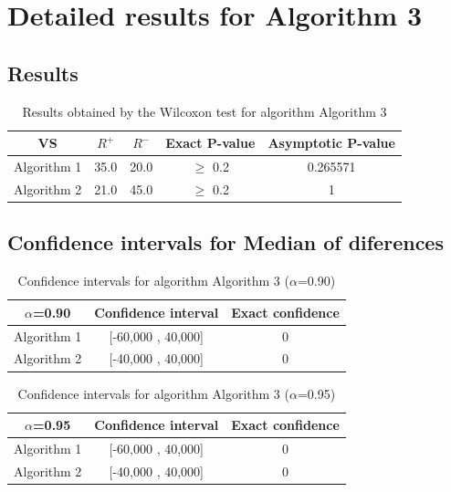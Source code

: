 \documentclass[a4paper,10pt]{article}
\begin{document}
 \clearpage 


\section{Detailed results for Algorithm 3}


\subsection{Results}

\begin{table}[!htp]
\centering\small
\begin{tabular}{
|c|c|c|c|c|}
\hline
 VS & $R^{+}$ & $R^{-}$ & Exact P-value & Asymptotic P-value \\ \hline 
Algorithm 1 & 35.0 & 20.0 & $\geq$ 0.2 & 0.265571\\ \hline 
Algorithm 2 & 21.0 & 45.0 & $\geq$ 0.2 & 1\\ \hline 

\end{tabular}
\caption{Results obtained by the Wilcoxon test for algorithm Algorithm 3}
\end{table}

\subsection{Confidence intervals for Median of diferences}

\begin{table}[!htp]
\centering\small
\begin{tabular}{
|c|c|c|}
\hline
 $\alpha$=0.90 & Confidence interval & Exact confidence \\ \hline 
Algorithm 1 & [-60,000 , 40,000] & 0\\ \hline 
Algorithm 2 & [-40,000 , 40,000] & 0\\ \hline 

\end{tabular}
\caption{Confidence intervals for algorithm Algorithm 3 ($\alpha$=0.90)}
\end{table}
\begin{table}[!htp]
\centering\small
\begin{tabular}{
|c|c|c|}
\hline
 $\alpha$=0.95 & Confidence interval & Exact confidence \\ \hline 
Algorithm 1 & [-60,000 , 40,000] & 0\\ \hline 
Algorithm 2 & [-40,000 , 40,000] & 0\\ \hline 

\end{tabular}
\caption{Confidence intervals for algorithm Algorithm 3 ($\alpha$=0.95)}
\end{table}

 \clearpage 
\end{document}
